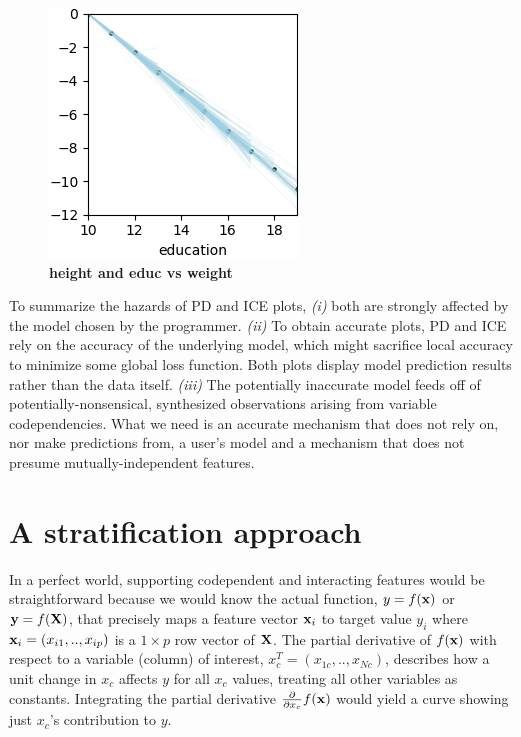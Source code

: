 \documentclass[12pt]{article}
\begin{document}
\begin{figure}[htbp]
\begin{center}
\includegraphics[scale=0.7]{images/education_vs_weight_stratpd.png}
\caption{{\bf  height and educ vs weight}}
\label{fig:height_education_vs_weight}
\end{center}
\end{figure}

To summarize the hazards of PD and ICE plots, {\em (i)} both are strongly affected by the model chosen by the programmer.  {\em (ii)} To obtain accurate plots, PD and ICE rely on the accuracy of the underlying model, which might sacrifice local accuracy to minimize some global loss function.  Both plots display model prediction results rather than the data itself. {\em (iii)} The potentially inaccurate model feeds off of potentially-nonsensical, synthesized observations arising from variable codependencies. What we need is an accurate mechanism that does not rely on, nor make predictions from, a user's model and a mechanism that does not presume mutually-independent features.

\section{A stratification approach}

In a perfect world, supporting codependent and interacting features would be straightforward because we would know the actual function, $y = f({\bf x})$ or ${\bf y} = f(\bf X)$, that precisely maps a feature vector ${\bf x}_i$ to target value $y_i$ where ${\bf x}_i = ( x_{i1}, .., x_{ip} )$ is a $1 \times p$ row vector of $\bf X$. The partial derivative of $f({\bf x})$ with respect to a variable (column) of interest, $x_c^T = (x_{1c}, .., x_{Nc})$, describes how a unit change in $x_c$ affects $y$ for all $x_c$ values, treating all other variables as constants. Integrating the partial derivative $\frac{\partial}{\partial x_{c}} f({\bf x})$ would yield a curve showing just $x_{c}$'s contribution to $y$. 
\end{document}
